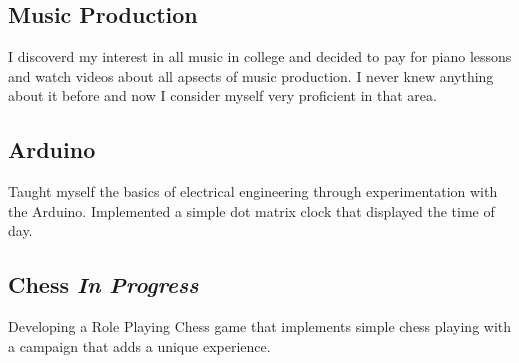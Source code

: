 \documentclass{article}[11pt]
\begin{document}
\begin{multicols}{2}
	\subsection*{Music Production}
	I discoverd my interest in all music in college and decided to pay for piano lessons and watch videos about all apsects of music production. I never knew anything about it before and now I consider myself very proficient in that area.
	\subsection*{Arduino}
	Taught myself the basics of electrical engineering through experimentation with the Arduino. Implemented a simple dot matrix clock that displayed the time of day.
\end{multicols}
\begin{multicols}{2}
\end{multicols}
		\subsection*{Chess \textit{In Progress}}
		Developing a Role Playing Chess game that implements simple chess playing with a campaign that adds a unique experience.
\end{document}

